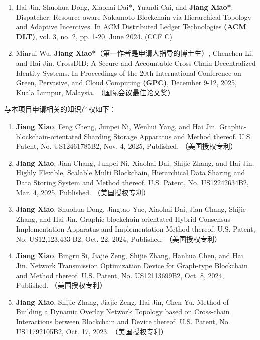 {\begin{enumerate}[itemsep=0pt, topsep=0pt, parsep=0pt]
    \item Hai Jin, Shuohua Dong, Xiaohai Dai*, Yuandi Cai, and \textbf{Jiang Xiao*}. Dispatcher: Resource-aware Nakamoto Blockchain via Hierarchical Topology and Adaptive Incentives. In ACM Distributed Ledger Technologies \textbf{(ACM DLT)}, vol. 3, no. 2, pp. 1-20, June 2024. (CCF C)

    \item Minrui Wu, \textbf{Jiang Xiao*}（第一作者是申请人指导的博士生）, Chenchen Li, and Hai Jin. CrossDID: A Secure and Accountable Cross-Chain Decentralized Identity Systems. In Proceedings of the 20th International Conference on Green, Pervasive, and Cloud Computing \textbf{(GPC)}, December 9-12, 2025, Kuala Lumpur, Malaysia. （国际会议最佳论文奖）
\end{enumerate}

与本项目申请相关的知识产权如下：

\begin{enumerate}[itemsep=0pt, topsep=0pt, parsep=0pt]
    \item \textbf{Jiang Xiao}, Feng Cheng, Junpei Ni, Wenhui Yang, and Hai Jin. Graphic-blockchain-orientated Sharding Storage Apparatus and Method thereof. U.S. Patent, No. US12461785B2, Nov. 4, 2025, Published. （美国授权专利）

    \item \textbf{Jiang Xiao}, Jian Chang, Junpei Ni, Xiaohai Dai, Shijie Zhang, and Hai Jin. Highly Flexible, Scalable Multi Blockchain, Hierarchical Data Sharing and Data Storing System and Method thereof. U.S. Patent, No. US12242634B2, Mar. 4, 2025, Published. （美国授权专利）

    \item \textbf{Jiang Xiao}, Shuohua Dong, Jingtao Yue, Xiaohai Dai, Jian Chang, Shijie Zhang, and Hai Jin. Graphic-blockchain-orientated Hybrid Consensus Implementation Apparatus and Implementation Method thereof. U.S. Patent, No. US12,123,433 B2, Oct. 22, 2024, Published. （美国授权专利）

    \item \textbf{Jiang Xiao}, Bingru Si, Jiajie Zeng, Shijie Zhang, Hanhua Chen, and Hai Jin. Network Transmission Optimization Device for Graph-type Blockchain and Method thereof. U.S. Patent, No. US12113699B2, Oct. 8, 2024, Published. （美国授权专利）

    \item \textbf{Jiang Xiao}, Shijie Zhang, Jiajie Zeng, Hai Jin, Chen Yu. Method of Building a Dynamic Overlay Network Topology based on Cross-chain Interactions between Blockchain and Device thereof. U.S. Patent, No. US11792105B2, Oct. 17, 2023. （美国授权专利）


\end{enumerate}}
